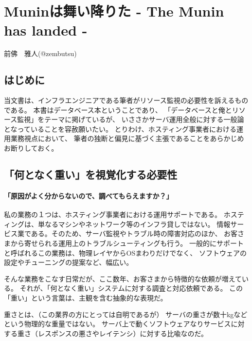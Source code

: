 
\chapter{Muninは舞い降りた - The Munin has landed -}

\begin{flushright}
 {\headfont 前佛　雅人(@zembutsu)} %
\end{flushright}

\section{はじめに}

当文書は、インフラエンジニアである筆者がリソース監視の必要性を訴えるものである。
本書はデータベース本ということであり、
「データベースと俺とリソース監視」をテーマに掲げているが、
いささかサーバ運用全般に対する一般論となっていることを容赦願いたい。
とりわけ、ホスティング事業者における運用業務視点において、
筆者の独断と偏見に基づく主張であることをあらかじめお断りしておく。

\section{「何となく重い」を視覚化する必要性}
\subsubsection{「原因がよく分からないので、調べてもらえますか？」}
私の業務の１つは、ホスティング事業者における運用サポートである。
ホスティングは、単なるマシンやネットワーク等のインフラ貸しではない。
情報サービス業である。そのため、サーバ監視やトラブル時の障害対応のほか、
お客さまから寄せられる運用上のトラブルシューティングも行う。
一般的にサポートと呼ばれるこの業務は、物理レイヤからOSまわりだけでなく、
ソフトウェアの設定やチューニングの提案など、幅広い。

そんな業務をこなす日常だが、ここ数年、お客さまから特徴的な依頼が増えている。
それが、「何となく重い」システムに対する調査と対応依頼である。
この「重い」という言葉は、主観を含む抽象的な表現だ。

重さとは、（この業界の方にとっては自明であるが）
サーバの重さが数十kgなどという物理的な重量ではない。
サーバ上で動くソフトウェアなりサービスに対する重さ（レスポンスの悪さやレイテンシ）に対する比喩なのだ。


